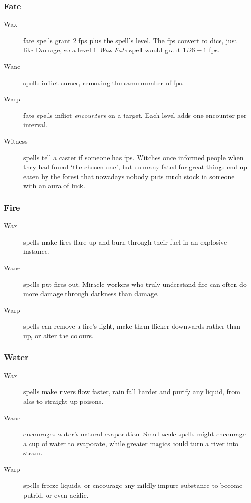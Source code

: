 \begin{multicols}{2}
\subsubsection{Fate}

\begin{description}
  \item[Wax]
  fate spells grant 2 \glspl{fp} plus the spell's level.
  The \glspl{fp} convert to dice, just like Damage, so a level 1 \textit{Wax Fate} spell would grant $1D6-1$ \glspl{fp}.
  \item[Wane]
  spells inflict curses, removing the same number of \glspl{fp}.
  \item[Warp]
  fate spells inflict \emph{encounters} on a target.
  Each level adds one encounter per interval.%
  \iftoggle{judgement}{%
    \footnote{\Glspl{gm} looking for encounter ideas can find a system in \textit{Judgement}: \nameref{encounters}, \autopageref{encounters}.}%
  }{}
  \item[Witness]
  spells tell a caster if someone has \glspl{fp}.
  Witches once informed people when they had found `the chosen one', but so many fated for great things end up eaten by the forest that nowadays nobody puts much stock in someone with an aura of luck.
\end{description}

\subsubsection{Fire}

\begin{description}
  \item[Wax]
  spells make fires flare up and burn through their fuel in an explosive instance.
  \item[Wane]
  spells put fires out.
  Miracle workers who truly understand fire can often do more damage through darkness than damage.
  \item[Warp]
  spells can remove a fire's light, make them flicker downwards rather than up, or alter the colours.
\end{description}

\subsubsection{Water}

\begin{description}
  \item[Wax]
  spells make rivers flow faster, rain fall harder and purify any liquid, from ales to straight-up poisons.
  \item[Wane]
  encourages water's natural evaporation.
  Small-scale spells might encourage a cup of water to evaporate, while greater magics could turn a river into steam.
  \item[Warp]
  spells freeze liquids, or encourage any mildly impure substance to become putrid, or even acidic.
\end{description}


\end{multicols}
